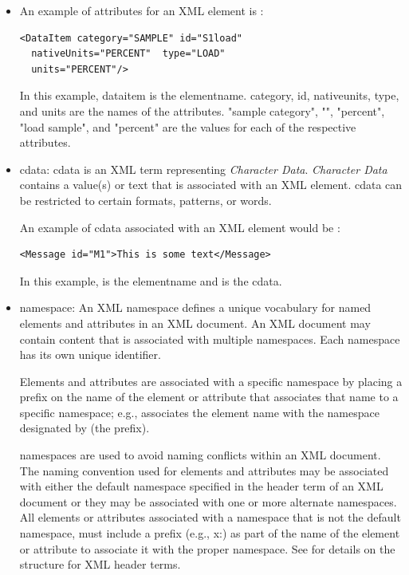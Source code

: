 \documentclass{mtconnect}	%
\begin{document}
\begin{itemize}
\item An example of attributes for an XML element is :

\begin{lstlisting}[firstnumber=1,escapechar=|,%
    caption={Example of  attributes for an element}, label={lst:attributes-for-an-element}]
<DataItem category="SAMPLE" id="S1load"
  nativeUnits="PERCENT"  type="LOAD"
  units="PERCENT"/>
\end{lstlisting}

In this example, \gls{dataitem} is the \gls{elementname}.  \gls{category}, \gls{id}, \gls{nativeunits}, \gls{type}, and \gls{units} are the names of the attributes.  "\gls{sample category}", "", "\gls{percent}", "\gls{load sample}", and "\gls{percent}" are the values for each of the respective attributes.

\item \gls{cdata}:  \gls{cdata} is an XML term representing \textit{Character Data}. \textit{Character Data} contains a value(s) or text that is associated with an XML element.  \gls{cdata} can be restricted to certain formats, patterns, or words.  

An example of \gls{cdata} associated with an XML element would be :

\begin{lstlisting}[firstnumber=1,escapechar=|,%
    caption={Example of cdata associated with element}, label={lst:cdata-associated-with-element}]
<Message id="M1">This is some text</Message>
\end{lstlisting}

In this example,  is the \gls{elementname} and  is the \gls{cdata}.

\item \gls{namespace}:  An XML \gls{namespace} defines a unique vocabulary for named elements and attributes in an XML document.  An XML document may contain content that is associated with multiple \glspl{namespace}.  Each \gls{namespace} has its own unique identifier. 

Elements and attributes are associated with a specific \gls{namespace} by placing a prefix on the name of the element or attribute that associates that name to a specific \gls{namespace}; e.g.,  associates the element name  with the \gls{namespace} designated by  (the prefix).

\glspl{namespace} are used to avoid naming conflicts within an XML document.  The naming convention used for elements and attributes may be associated with either the default \gls{namespace} specified in the \gls{header term} of an XML document or they may be associated with one or more alternate \glspl{namespace}.  All elements or attributes associated with a \gls{namespace} that is not the default \gls{namespace}, must include a prefix (e.g., x:) as part of the name of the element or attribute to associate it with the proper \gls{namespace}.  See  for details on the structure for XML \glspl{header term}.


\end{itemize}
\end{document}
